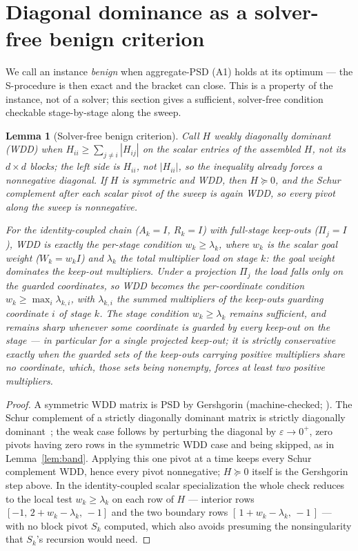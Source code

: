 \documentclass[11pt]{article}
\newtheorem{lemma}{Lemma}
\theoremstyle{definition}
\theoremstyle{remark}
\renewcommand{\_}{\ifdim\fontdimen3\font=0pt\relax\char`\_\else\textunderscore\fi\hspace{0pt}}
\begin{document}
\section{Diagonal dominance as a solver-free benign criterion}\label{sec:regime}
We call an instance \emph{benign} when aggregate-PSD (A1) holds at its optimum
--- the S-procedure is then exact and the bracket can close. This is a
property of the instance, not of a solver; this section gives a sufficient,
solver-free condition checkable stage-by-stage along the sweep.

\begin{lemma}[Solver-free benign criterion]\label{lem:dd}
Call $H$ \emph{weakly diagonally dominant} (WDD) when
$H_{ii}\ge\sum_{j\ne i}|H_{ij}|$ on the \emph{scalar} entries of the
assembled $H$, not its $d\times d$ blocks; the left side is $H_{ii}$, not
$|H_{ii}|$, so the inequality already forces a nonnegative diagonal. If $H$
is symmetric and WDD, then $H\succeq0$, and the Schur complement after each
scalar pivot of the sweep is again WDD, so every pivot along the sweep is
nonnegative.

For the identity-coupled chain ($A_k=I$, $R_k=I$) with full-stage keep-outs
($\Pi_j=I$), WDD is exactly the per-stage condition $w_k\ge\lambda_k$, where
$w_k$ is the scalar goal weight ($W_k=w_kI$) and $\lambda_k$ the total
multiplier load on stage $k$: the goal weight dominates the keep-out
multipliers. Under a projection $\Pi_j$ the load falls only on the guarded
coordinates, so WDD becomes the per-coordinate condition
$w_k\ge\max_i\lambda_{k,i}$, with $\lambda_{k,i}$ the summed multipliers of
the keep-outs guarding coordinate $i$ of stage $k$. The stage condition
$w_k\ge\lambda_k$ remains sufficient, and remains sharp whenever some
coordinate is guarded by every keep-out on the stage --- in particular for a
single projected keep-out; it is strictly conservative exactly when the
guarded sets of the keep-outs carrying \emph{positive} multipliers share no
coordinate, which, those sets being nonempty, forces at least two positive
multipliers.
\end{lemma}
\begin{proof}
A symmetric WDD matrix is PSD by Gershgorin (machine-checked;
\cite{leannote}). The Schur complement of a strictly diagonally dominant
matrix is strictly diagonally dominant~\cite{carlson1979}; the weak case
follows by perturbing the diagonal by $\varepsilon\to0^+$, zero pivots having
zero rows in the symmetric WDD case and being skipped, as in
Lemma~\ref{lem:band}. Applying this one pivot at a time keeps every Schur
complement WDD, hence every pivot nonnegative; $H\succeq0$ itself is the
Gershgorin step above. In the identity-coupled scalar specialization the whole
check reduces to the local test $w_k\ge\lambda_k$ on each row of $H$ ---
interior rows $[-1,\,2+w_k-\lambda_k,\,-1]$ and the two boundary rows
$[\,1+w_k-\lambda_k,\,-1\,]$ --- with no block pivot $S_k$ computed, which
also avoids presuming the nonsingularity that $S_k$'s recursion would need.
\end{proof}
\end{document}
